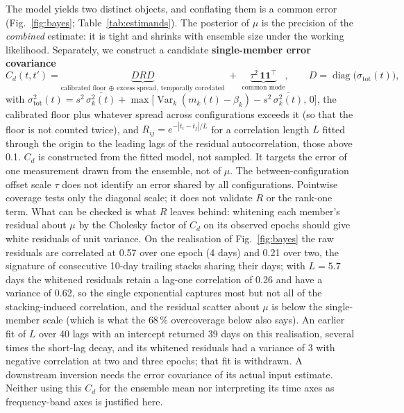 \documentclass[
  referee]{gji}
\begin{document}
The model yields two distinct objects, and conflating them is a common
error (Fig.~\ref{fig:bayes}; Table~\ref{tab:estimands}). The posterior
of \(\mu\) is the precision of the \emph{combined} estimate: it is tight
and shrinks with ensemble size under the working likelihood. Separately,
we construct a candidate \textbf{single-member error covariance}
\begin{equation}
C_d(t,t') = \underbrace{D R D}_{\text{calibrated floor}\,\oplus\,\text{excess spread},\ \text{temporally correlated}}
\;+\; \underbrace{\tau^2\,\mathbf{1}\mathbf{1}^\top}_{\text{common mode}},
\qquad D=\operatorname{diag}\!\big(\sigma_{\mathrm{tot}}(t)\big),
\label{eq:cd}
\end{equation} with
\(\sigma_{\mathrm{tot}}^2(t) = s^2\,\overline{\sigma_k^2(t)} +
\max\!\big[\operatorname{Var}_k(m_k(t)-\beta_k) - s^2\,\overline{\sigma_k^2(t)},\,0\big]\),
the calibrated floor plus whatever spread across configurations exceeds
it (so that the floor is not counted twice), and
\(R_{ij}=e^{-|t_i-t_j|/L}\) for a correlation length \(L\) fitted
through the origin to the leading lags of the residual autocorrelation,
those above 0.1. \(C_d\) is constructed from the fitted model, not
sampled. It targets the error of one measurement drawn from the
ensemble, not of \(\mu\). The between-configuration offset scale
\(\tau\) does not identify an error shared by all configurations.
Pointwise coverage tests only the diagonal scale; it does not validate
\(R\) or the rank-one term. What can be checked is what \(R\) leaves
behind: whitening each member's residual about \(\mu\) by the Cholesky
factor of \(C_d\) on its observed epochs should give white residuals of
unit variance. On the realisation of Fig.~\ref{fig:bayes} the raw
residuals are correlated at 0.57 over one epoch (4 days) and 0.21 over
two, the signature of consecutive 10-day trailing stacks sharing their
days; with \(L=5.7\) days the whitened residuals retain a lag-one
correlation of 0.26 and have a variance of 0.62, so the single
exponential captures most but not all of the stacking-induced
correlation, and the residual scatter about \(\mu\) is below the
single-member scale (which is what the \(68\,\%\) overcoverage below
also says). An earlier fit of \(L\) over 40 lags with an intercept
returned 39 days on this realisation, several times the short-lag decay,
and its whitened residuals had a variance of 3 with negative correlation
at two and three epochs; that fit is withdrawn. A downstream inversion
needs the error covariance of its actual input estimate. Neither using
this \(C_d\) for the ensemble mean nor interpreting its time axes as
frequency-band axes is justified here.
\end{document}
